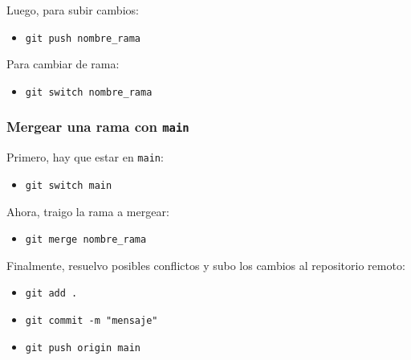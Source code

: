 \documentclass{article} %
\begin{document}
Luego, para subir cambios:

\begin{itemize}
    \item \texttt{git push nombre\_rama}
\end{itemize}

Para cambiar de rama:

\begin{itemize}
    \item \texttt{git switch nombre\_rama}
\end{itemize}

\subsubsection{Mergear una rama con \texttt{main}}

Primero, hay que estar en \texttt{main}:

\begin{itemize}
    \item \texttt{git switch main}
\end{itemize}

Ahora, traigo la rama a mergear:

\begin{itemize}
    \item \texttt{git merge nombre\_rama}
\end{itemize}

Finalmente, resuelvo posibles conflictos y subo los cambios al repositorio remoto:

\begin{itemize}
    \item \texttt{git add .}
    \item \texttt{git commit -m "mensaje"}
    \item \texttt{git push origin main}
\end{itemize}
\end{document}
